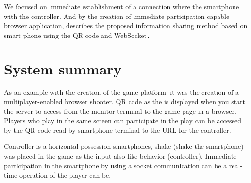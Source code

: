 We focused on immediate establishment of a connection where the smartphone with the controller. And by the creation of immediate participation capable browser application, describes the proposed information sharing method based on smart phone using the QR code and WebSocket\cite{ec2015}．


\section{System summary}

As an example with the creation of the game platform, it was the creation of a multiplayer-enabled browser shooter. QR code as the  is displayed when you start the server to access from the monitor terminal to the game page in a browser. Players who play in the same screen can participate in the play can be accessed by the QR code read by smartphone terminal to the URL for the controller.

Controller is a horizontal possession smartphones, shake (shake the smartphone) was placed in the game as the input also like behavior \figref(controller). Immediate participation in the smartphone by using a socket communication \cite{webpagesocketio} can be a real-time operation of the player can be.


